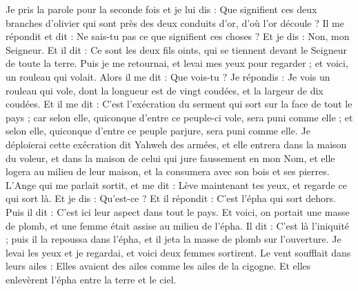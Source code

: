 \begin{multicols}{2}
Je pris la parole pour la seconde fois et je lui dis : Que signifient ces deux branches d'olivier qui sont près des deux conduits d'or, d’où l'or découle ?
Il me répondit et dit : Ne sais-tu pas ce que signifient ces choses ? Et je dis : Non, mon Seigneur.
Et il dit : Ce sont les  deux fils oints, qui se tiennent devant le Seigneur de toute la terre.
\VerseOne{}Puis je me retournai, et levai mes yeux pour regarder ; et voici, un rouleau qui volait.
Alors il me dit : Que vois-tu ? Je répondis : Je vois un rouleau qui vole, dont la longueur est de vingt coudées, et la largeur de dix coudées.
Et il me dit : C'est l’exécration du serment qui sort sur la face de tout le pays ; car selon elle, quiconque d'entre ce peuple-ci vole, sera puni comme elle ; et selon elle, quiconque d'entre ce peuple parjure, sera puni comme elle.
Je déploierai cette exécration dit Yahweh des armées, et elle entrera dans la maison du voleur, et dans la maison de celui qui jure faussement en mon Nom, et elle logera au milieu de leur maison, et la consumera avec son bois et ses pierres.
L’Ange qui me parlait sortit, et me dit : Lève maintenant tes yeux, et regarde ce qui sort là.
Et je dis : Qu'est-ce ? Et il répondit : C'est l’épha qui sort dehors. Puis il dit : C'est ici leur aspect dans tout le pays.
Et voici, on portait une masse de plomb, et une femme était assise au milieu de l'épha.
Il dit : C'est là l’iniquité ; puis il la repoussa dans l'épha, et il jeta la masse de plomb sur l’ouverture.
Je levai les yeux et je regardai, et voici deux femmes sortirent. Le vent soufflait dans leurs ailes : Elles avaient des ailes comme les ailes de la cigogne. Et elles enlevèrent l'épha entre la terre et le ciel.

\end{multicols}
